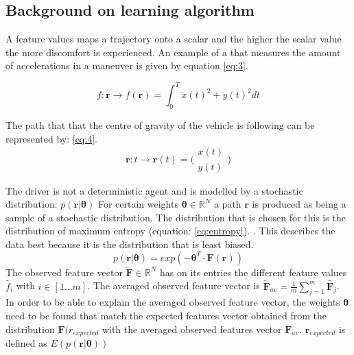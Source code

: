 \subsection{Background on learning algorithm}
A feature values maps a trajectory onto a scalar and the higher the scalar value the more discomfort is experienced. An example of a that measures the amount of accelerations in a maneuver is given by equation \ref{eq:3}.

\begin{equation}\label{eq:3}
f:\bm{r}\xrightarrow{}f(\bm{r})=\int_{0}^{T}\ddot{x}(t)^{2}+\ddot{y}(t)^{2} dt
\end{equation}

The path that that the centre of gravity of the vehicle is following can be represented by: \ref{eq:4}.
\begin{equation}\label{eq:4}
\bm{r}:t \xrightarrow{}\bm{r}(t) =  \bigl( \begin{smallmatrix} x(t)\\ y(t) \end{smallmatrix}\bigr)
\end{equation}

The driver is not a deterministic agent and is modelled by a stochastic distribution: $p(\bm{r}|\bm{\theta})$ For certain weights $\bm{\theta} \in \mathbb{R}^N$ a path $\bm{r}$ is produced as being a sample of a stochastic distribution. The distribution that is chosen for this is the distribution of maximum entropy (equation: \ref{eq:entropy}). \cite{Ziebart2008}. This describes the data best because it is the distribution that is least biased. \cite{Kuderer2015a}
\begin{equation}\label{eq:entropy}
	p(\bm{r}|\bm{\theta}) = exp(-\bm{\theta}^T\cdot \bm{F}(\bm{r}))
\end{equation}
The observed feature vector $\tilde{\bm{F}} \in \mathbb{R}^N$ has on its entries the different feature values $\tilde{f_i}$ with $i \in [1...m]$. The averaged observed feature vector is $\tilde{\bm{F}}_{av} = \frac{1}{m}\sum_{j=1}^{m}\tilde{\bm{F}_j}$.\\

In order to be able to explain the averaged observed feature vector, the weights $\bm{\theta}$ need to be found that match the expected features vector obtained from the distribution $\bm{F}(r_{expected}$ with the averaged observed features vector $\bm{F}_{av}$. $\bm{r}_{expected}$ is defined as $ E(p(\bm{r}|\bm{\theta}))$\\






